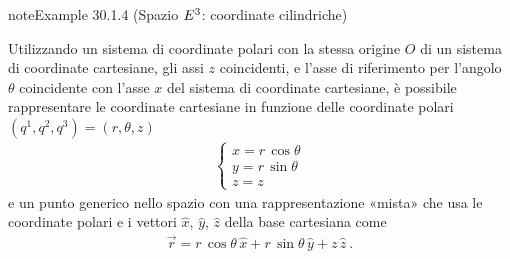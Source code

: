 \documentclass[letterpaper,10pt,italian]{jupyterBook}
\begin{document}
\label{ch/vector-calculus/geometry:def-cylindrical-coords-e3}
\begin{sphinxadmonition}{note}{Example 30.1.4 (Spazio \protect\(E^3\protect\): coordinate cilindriche)}



\sphinxAtStartPar
Utilizzando un sistema di coordinate polari con la stessa origine \(O\) di un sistema di coordinate cartesiane, gli assi \(z\) coincidenti, e l’asse di riferimento per l’angolo \(\theta\) coincidente con l’asse \(x\) del sistema di coordinate cartesiane, è possibile rappresentare le coordinate cartesiane in funzione delle coordinate polari \((q^1, q^2, q^3) = (r, \theta, z)\)
\begin{equation*}
\begin{split}\begin{cases}
  x = r \, \cos \theta \\
  y = r \, \sin \theta \\
  z = z 
\end{cases}\end{split}
\end{equation*}
\sphinxAtStartPar
e un punto generico nello spazio \sphinxhyphen{} con una rappresentazione «mista» che usa le coordinate polari e i vettori \(\hat{x}\), \(\hat{y}\), \(\hat{z}\) della base cartesiana\sphinxfootnotemark[1] \sphinxhyphen{} come
\begin{equation*}
\begin{split}\vec{r} = r \, \cos \theta \, \hat{x} + r \, \sin \theta \, \hat{y} + z \, \hat{z} \ .\end{split}
\end{equation*}\end{sphinxadmonition}
\label{ch/vector-calculus/geometry:def-spherical-coords-e3}
\end{document}
